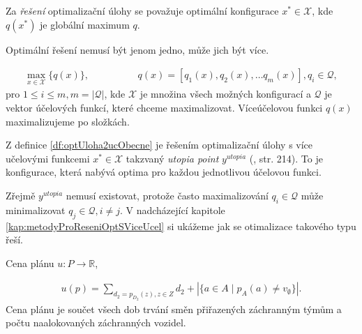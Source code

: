 \begin{definice}\label{df:reseniOptUlohSJednouUcFunOb}
  Za \textit{řešení} optimalizační úlohy se považuje optimální konfigurace $x^* \in \mathcal{X}$,
  kde $q(x^*)$ je globální maximum $q$.
\end{definice}

Optimální řešení nemusí být jenom jedno, může jich být více.

\begin{definice}\label{df:optUloha2ucObecne}
  \begin{align*}
    \max_{x \in \mathcal{X}} \{ q(x) \}, \hspace{50pt} &q(x) = [q_1(x), q_2(x), \dots q_{m}(x)], q_i \in \mathcal{Q},
  \end{align*}
  pro $1 \leq i \leq m, m = |\mathcal{Q}|$,
  kde $\mathcal{X}$ je množina všech možných konfigurací a $\mathcal{Q}$ je vektor účelových funkcí, které chceme maximalizovat.
  Víceúčelovou funkci $q(x)$ maximalizujeme po složkách.
\end{definice}

\begin{definice}\label{df:reseniOptUlohSViceUcFunOb}
  Z definice \ref{df:optUloha2ucObecne} je řešením optimalizační úlohy s více učelovými funkcemi 
  $x^* \in \mathcal{X}$ takzvaný \textit{utopia point} $y^{utopia}$ (\citet{AlgOptBook}, str. 214).
  To je konfigurace, která nabývá optima pro každou jednotlivou účelovou funkci.
\end{definice}

Zřejmě $y^{utopia}$ nemusí existovat, protože často maximalizování $q_i \in \mathcal{Q}$ může minimalizovat $q_j \in \mathcal{Q}, i \neq j$.
V nadcházející kapitole \ref{kap:metodyProReseniOptSViceUcel} si ukážeme jak se otimalizace takového typu řeší.

\begin{definice}\label{df:cenaPlanu}
  Cena plánu $u \colon P \rightarrow \mathbb{R}$,

  \begin{align*}
    u(p) = \sum_{d_2 = p_{D_2}(z), z \in Z} d_2 + |\{ a \in A \mid p_{A}(a) \neq v_{\emptyset} \}|.
  \end{align*}
  Cena plánu je součet všech dob trvání směn přiřazených záchranným týmům a počtu naalokovaných záchranných vozidel.
\end{definice}

